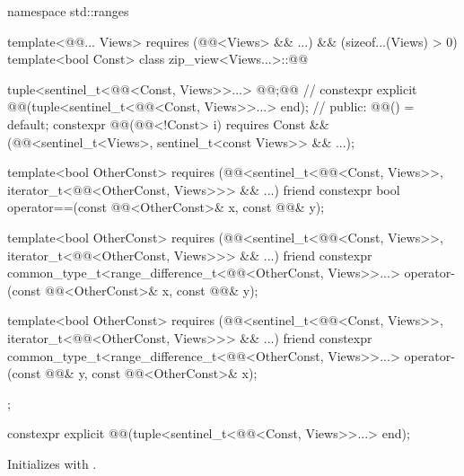 \begin{codeblock}
namespace std::ranges {
  template<@@... Views>
    requires (@@<Views> && ...) && (sizeof...(Views) > 0)
  template<bool Const>
  class zip_view<Views...>::@@ {
    tuple<sentinel_t<@@<Const, Views>>...> @@;@\itcorr[-1]@               // \expos
    constexpr explicit @@(tuple<sentinel_t<@@<Const, Views>>...> end);
                                                                                // \expos
  public:
    @@() = default;
    constexpr @@(@@<!Const> i)
      requires Const && (@@<sentinel_t<Views>, sentinel_t<const Views>> && ...);

    template<bool OtherConst>
      requires (@@<sentinel_t<@@<Const, Views>>,
                             iterator_t<@@<OtherConst, Views>>> && ...)
    friend constexpr bool operator==(const @@<OtherConst>& x, const @@& y);

    template<bool OtherConst>
      requires (@@<sentinel_t<@@<Const, Views>>,
                                   iterator_t<@@<OtherConst, Views>>> && ...)
    friend constexpr common_type_t<range_difference_t<@@<OtherConst, Views>>...>
      operator-(const @@<OtherConst>& x, const @@& y);

    template<bool OtherConst>
      requires (@@<sentinel_t<@@<Const, Views>>,
                                   iterator_t<@@<OtherConst, Views>>> && ...)
    friend constexpr common_type_t<range_difference_t<@@<OtherConst, Views>>...>
      operator-(const @@& y, const @@<OtherConst>& x);
  };
}
\end{codeblock}

\begin{itemdecl}
constexpr explicit @@(tuple<sentinel_t<@@<Const, Views>>...> end);
\end{itemdecl}

\begin{itemdescr}
\pnum
\effects
Initializes  with .
\end{itemdescr}

